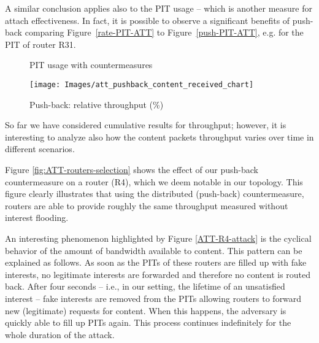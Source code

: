 \documentclass[10pt,conference,letterpaper]{IEEEtran}
\begin{document}
A similar conclusion applies also to the PIT usage -- which is another measure for attach effectiveness.
In fact, 
it is possible to observe a significant benefits of push-back comparing Figure~\ref{rate-PIT-ATT} to Figure~\ref{push-PIT-ATT}, e.g. for the PIT of router R31. 




\begin{comment}
\begin{figure}[ht]
 \centering
{\texttt{[image: Images/att\_PIT\_Chart\_average\_simple]}}
 \caption{Rate-based (local) countermeasure: PIT}
\label{rate-PIT-ATT}
\label{fig:rate-based-count}
 \end{figure}
\end{comment}


\begin{figure*}[htp!]
 \centering
{}
 \hspace{-3mm}
 \caption{PIT usage with countermeasures}
\label{fig:push-back-count}
 \end{figure*}






\begin{figure*}[htp!]
 \centering
{\texttt{[image: Images/att\_pushback\_content\_received\_chart]}} 
 \caption{Push-back: relative throughput (\%)}
\label{push-throughput-ATT}
\label{fig:push-back-count}
 \end{figure*}







So far we have considered cumulative results for throughput; however, it is interesting to analyze also how the content packets throughput varies over time in different scenarios.


{Figure \ref {fig:ATT-routers-selection} shows the effect of our push-back countermeasure on a router (R4), which we deem notable in our topology.
This figure clearly illustrates that using the distributed (push-back) countermeasure, routers are able to provide roughly the same throughput measured without interest flooding.}

An interesting phenomenon highlighted by 
Figure \ref{ATT-R4-attack} is the cyclical behavior of the amount of bandwidth available to content.
This pattern can be explained as follows. As soon as the PITs of these routers are filled up with fake interests, no legitimate interests are forwarded and therefore no content is routed back. After four seconds -- i.e., in our setting, the lifetime of an unsatisfied interest  -- fake interests are removed from the PITs allowing routers to forward new (legitimate) requests for content. When this happens, the adversary is quickly able to fill up PITs again. This process continues indefinitely for the whole duration of the attack.
\end{document}
